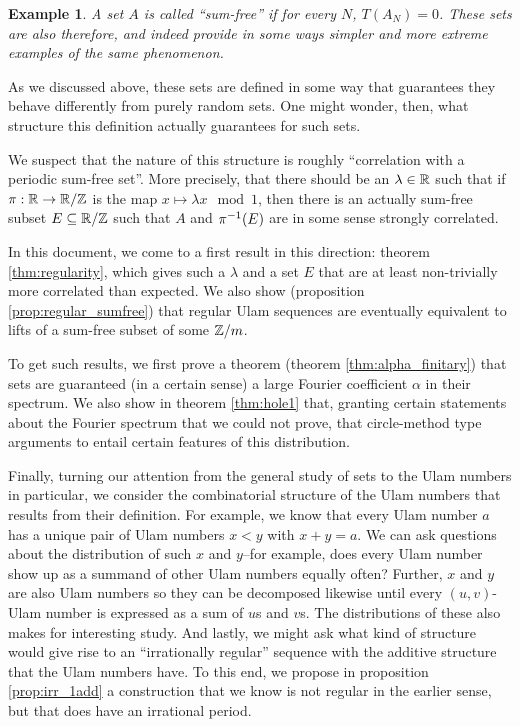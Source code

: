 \documentclass{report}
\newtheorem{example}{Example}
\theoremstyle{remark}
\numberwithin{equation}{section}
\begin{document}
\begin{example}
  A set $A$ is called ``sum-free'' if for every $N$, $T(A_N) = 0$.
  These sets are also \relevant therefore, and indeed provide in some
  ways simpler and more extreme examples of the same phenomenon.  
\end{example}

As we discussed above, these sets are defined in some way that
guarantees they behave differently from purely random sets.  One might
wonder, then, what structure this definition actually guarantees for
such sets.

We suspect that the nature of this structure is roughly ``correlation
with a periodic sum-free set''.  More precisely, that there should be
an $\lambda \in \mathbb{R}$ such that if $\pi : \mathbb{R} \to \mathbb{R}/\mathbb{Z}$ is the map
$x \mapsto \lambda x\mod{1}$, then there is an actually sum-free
subset $E \subseteq \mathbb{R}/\mathbb{Z}$ such that $A$ and $\pi^{-1}(E)$ are in some
sense strongly correlated.  

In this document, we come to a first result in this direction: theorem
\ref{thm:regularity}, which gives such a $\lambda$ and a set $E$ that
are at least non-trivially more correlated than expected.  We also
show (proposition \ref{prop:regular_sumfree}) that regular Ulam
sequences are eventually equivalent to lifts of a sum-free subset of
some $\mathbb{Z}/m$.  

To get such results, we first prove a theorem (theorem
\ref{thm:alpha_finitary}) that \relevant sets are guaranteed (in a
certain sense) a large Fourier coefficient $\alpha$ in their spectrum.
We also show in theorem \ref{thm:hole1} that, granting certain
statements about the Fourier spectrum that we could not prove, that
circle-method type arguments to entail certain features of this
distribution.  

Finally, turning our attention from the general study of \relevant
sets to the Ulam numbers in particular, we consider the combinatorial
structure of the Ulam numbers that results from their definition.  For
example, we know that every Ulam number $a$ has a unique pair of Ulam
numbers $x < y$ with $x + y = a$.  We can ask questions about the
distribution of such $x$ and $y$--for example, does every Ulam number
show up as a summand of other Ulam numbers equally often?  Further,
$x$ and $y$ are also Ulam numbers so they can be decomposed likewise
until every $(u,v)$-Ulam number is expressed as a sum of $u$s and
$v$s.  The distributions of these also makes for interesting study.
And lastly, we might ask what kind of structure would give rise to an
``irrationally regular'' sequence with the additive structure that the
Ulam numbers have.  To this end, we propose in proposition
\ref{prop:irr_1add} a construction that we know is not regular in the
earlier sense, but that does have an irrational period.
\end{document}
